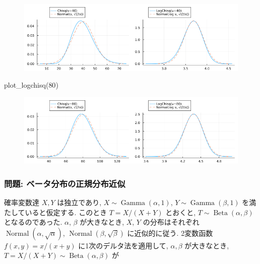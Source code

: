 \documentclass[
  letterpaper,
  DIV=11,
  numbers=noendperiod]{scrartcl}
\newenvironment{Shaded}{\begin{snugshade}}{\end{snugshade}}
\newcommand{\FloatTok}[1]{\textcolor[rgb]{0.68,0.00,0.00}{#1}}
\newcommand{\FunctionTok}[1]{\textcolor[rgb]{0.28,0.35,0.67}{#1}}
\newcommand{\NormalTok}[1]{\textcolor[rgb]{0.00,0.23,0.31}{#1}}
\begin{document}
\begin{figure}[H]

{\centering \includegraphics{05 Central limit theorem_files/figure-pdf/cell-107-output-1.png}

}

\end{figure}

\begin{Shaded}
\begin{Highlighting}[]
\FunctionTok{plot\_logchisq}\NormalTok{(}\FloatTok{80}\NormalTok{)}
\end{Highlighting}
\end{Shaded}

\begin{figure}[H]

{\centering \includegraphics{05 Central limit theorem_files/figure-pdf/cell-108-output-1.png}

}

\end{figure}

\hypertarget{ux554fux984c-ux30d9ux30fcux30bfux5206ux5e03ux306eux6b63ux898fux5206ux5e03ux8fd1ux4f3c}{%
\subsubsection{問題:
ベータ分布の正規分布近似}\label{ux554fux984c-ux30d9ux30fcux30bfux5206ux5e03ux306eux6b63ux898fux5206ux5e03ux8fd1ux4f3c}}

確率変数達 \(X,Y\) は独立であり,
\(X\sim\operatorname{Gamma}(\alpha,1)\),
\(Y\sim\operatorname{Gamma}(\beta,1)\) を満たしていると仮定する.
このとき \(T = X/(X+Y)\) とおくと,
\(T\sim \operatorname{Beta}(\alpha,\beta)\) となるのであった.
\(\alpha\), \(\beta\) が大きなとき, \(X\), \(Y\) の分布はそれぞれ
\(\operatorname{Normal}(\alpha, \sqrt{\alpha})\),
\(\operatorname{Normal}(\beta, \sqrt{\beta})\) に近似的に従う. 2変数函数
\(f(x,y)=x/(x+y)\) に1次のデルタ法を適用して, \(\alpha,\beta\)
が大きなとき, \(T=X/(X+Y)\sim \operatorname{Beta}(\alpha,\beta)\) が
\end{document}
